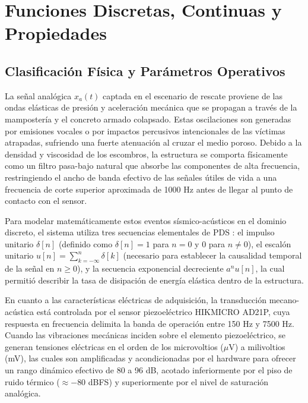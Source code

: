 \documentclass[journal, a4paper]{IEEEtran}
\begin{document}

\section{Funciones Discretas, Continuas y Propiedades}

\subsection{Clasificación Física y Parámetros Operativos}
La señal analógica $x_a(t)$ captada en el escenario de rescate proviene de las ondas elásticas de presión y aceleración mecánica que se propagan a través de la mampostería y el concreto armado colapsado. Estas oscilaciones son generadas por emisiones vocales o por impactos percusivos intencionales de las víctimas atrapadas, sufriendo una fuerte atenuación al cruzar el medio poroso. Debido a la densidad y viscosidad de los escombros, la estructura se comporta físicamente como un filtro pasa-bajo natural que absorbe las componentes de alta frecuencia, restringiendo el ancho de banda efectivo de las señales útiles de vida a una frecuencia de corte superior aproximada de 1000 Hz antes de llegar al punto de contacto con el sensor.

Para modelar matemáticamente estos eventos sísmico-acústicos en el dominio discreto, el sistema utiliza tres secuencias elementales de PDS \cite{Oppenheim}: el impulso unitario $\delta[n]$ (definido como $\delta[n]=1$ para $n=0$ y $0$ para $n \neq 0$), el escalón unitario $u[n] = \sum_{k=-\infty}^{n} \delta[k]$ (necesario para establecer la causalidad temporal de la señal en $n \ge 0$), y la secuencia exponencial decreciente $a^n u[n]$, la cual permitió describir la tasa de disipación de energía elástica dentro de la estructura.

En cuanto a las características eléctricas de adquisición, la transducción mecano-acústica está controlada por el sensor piezoeléctrico HIKMICRO AD21P, cuya respuesta en frecuencia delimita la banda de operación entre 150 Hz y 7500 Hz. Cuando las vibraciones mecánicas inciden sobre el elemento piezoeléctrico, se generan tensiones eléctricas en el orden de los microvoltios ($\mu$V) a milivoltios (mV), las cuales son amplificadas y acondicionadas por el hardware para ofrecer un rango dinámico efectivo de 80 a 96 dB, acotado inferiormente por el piso de ruido térmico ($\approx -80$ dBFS) y superiormente por el nivel de saturación analógica.
\end{document}
